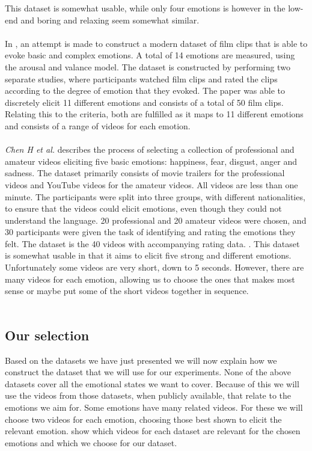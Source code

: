 This dataset is somewhat usable, while only four emotions is however in the low-end and boring and relaxing seem somewhat similar. \\\\
In \cite{FilmClips}, an attempt is made to construct a modern dataset of film clips that is able to evoke basic and complex emotions. A total of 14 emotions are measured, using the arousal and valance model. The dataset is constructed by performing two separate studies, where participants watched film clips and rated the clips according to the degree of emotion that they evoked. The paper was able to discretely elicit 11 different emotions and consists of a total of 50 film clips. Relating this to the criteria, both are fulfilled as it maps to 11 different emotions and consists of a range of videos for each emotion.\\\\
\textit{Chen H et al.} describes the process of selecting a collection of professional and amateur videos eliciting five basic emotions: happiness, fear, disgust, anger and sadness. The dataset primarily consists of movie trailers for the professional videos and YouTube videos for the amateur videos. All videos are less than one minute.
The participants were split into three groups, with different nationalities, to ensure that the videos could elicit emotions, even though they could not understand the language. 20 professional and 20 amateur videos were chosen, and 30 participants were given the task of identifying and rating the emotions they felt. The dataset is the 40 videos with accompanying rating data. \cite{CHEN2021106662}.
This dataset is somewhat usable in that it aims to elicit five strong and different emotions. Unfortunately some videos are very short, down to 5 seconds. However, there are many videos for each emotion, allowing us to choose the ones that makes most sense or maybe put some of the short videos together in sequence. \\\\

\subsection{Our selection}
Based on the datasets we have just presented we will now explain how we construct the dataset that we will use for our experiments. None of the above datasets cover all the emotional states we want to cover. Because of this we will use the videos from those datasets, when publicly available, that relate to the emotions we aim for. Some emotions have many related videos. For these we will choose two videos for each emotion, choosing those best shown to elicit the relevant emotion.  show which videos for each dataset are relevant for the chosen emotions and which we choose for our dataset.

